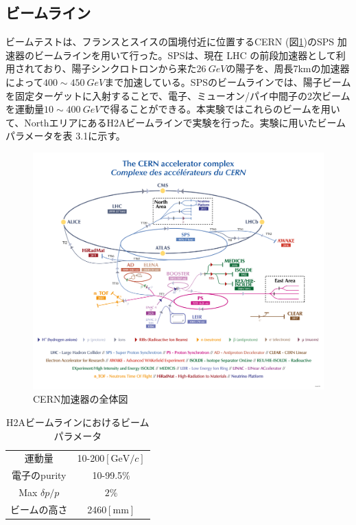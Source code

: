 \subsection{ビームライン}
ビームテストは、フランスとスイスの国境付近に位置するCERN (図\ref{cernmapping})のSPS 加速器のビームラインを用いて行った。SPSは、現在 LHC の前段加速器として利用されており、陽子シンクロトロンから来た$\SI{26}{GeV}$の陽子を、周長7kmの加速器によって$400\sim \SI{450}{GeV}$まで加速している。SPSのビームラインでは、陽子ビームを固定ターゲットに入射することで、電子、ミューオン/パイ中間子の2次ビームを運動量$10\sim \SI{400}{GeV}$で得ることができる。本実験ではこれらのビームを用いて、NorthエリアにあるH2Aビームラインで実験を行った。実験に用いたビームパラメータを表 3.1に示す。\\
\begin{figure}[H]
	\begin{center}
 \includegraphics[keepaspectratio, scale=0.7]
 	{Figure/Beamtest/cern.png}
 		\caption{CERN加速器の全体図\cite{cernmap}}
		\label{cernmapping}
	\end{center}
\end{figure}
\begin{table}[H]
 \centering
 \begin{tabular}{c c}
 \hline
運動量 & 10-200$[ \mathrm{GeV}/ c ]$\\
電子のpurity & 10-99.5\%\\
Max $\delta p / p$  & $2\%$\\
ビームの高さ & 2460$[ \mathrm{mm}]$\\
 \hline
 \end{tabular}
 \caption{H2Aビームラインにおけるビームパラメータ}
\end{table}

